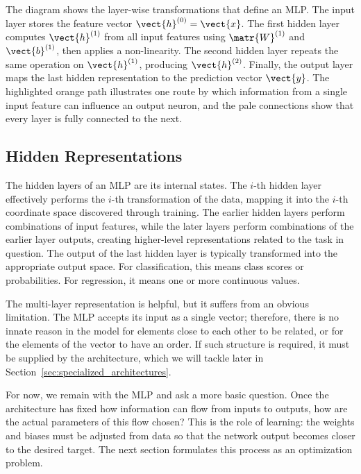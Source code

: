The diagram shows the layer-wise transformations that define an MLP. The input layer stores the feature vector $\vect{h}^{(0)}=\vect{x}$. The first hidden layer computes $\vect{h}^{(1)}$ from all input features using $\matr{W}^{(1)}$ and $\vect{b}^{(1)}$, then applies a non-linearity. The second hidden layer repeats the same operation on $\vect{h}^{(1)}$, producing $\vect{h}^{(2)}$. Finally, the output layer maps the last hidden representation to the prediction vector $\vect{y}$. The highlighted orange path illustrates one route by which information from a single input feature can influence an output neuron, and the pale connections show that every layer is fully connected to the next.

\subsection{Hidden Representations}

The hidden layers of an MLP are its internal states. The $i$-th hidden layer effectively performs the $i$-th transformation of the data, mapping it into the $i$-th coordinate space discovered through training. The earlier hidden layers perform combinations of input features, while the later layers perform combinations of the earlier layer outputs, creating higher-level representations related to the task in question. The output of the last hidden layer is typically transformed into the appropriate output space. For classification, this means class scores or probabilities. For regression, it means one or more continuous values.

The multi-layer representation is helpful, but it suffers from an obvious limitation. The MLP accepts its input as a single vector; therefore, there is no innate reason in the model for elements close to each other to be related, or for the elements of the vector to have an order. If such structure is required, it must be supplied by the architecture, which we will tackle later in Section~\ref{sec:specialized_architectures}.

For now, we remain with the MLP and ask a more basic question. Once the architecture has fixed how information can flow from inputs to outputs, how are the actual parameters of this flow chosen? This is the role of learning: the weights and biases must be adjusted from data so that the network output becomes closer to the desired target. The next section formulates this process as an optimization problem.
